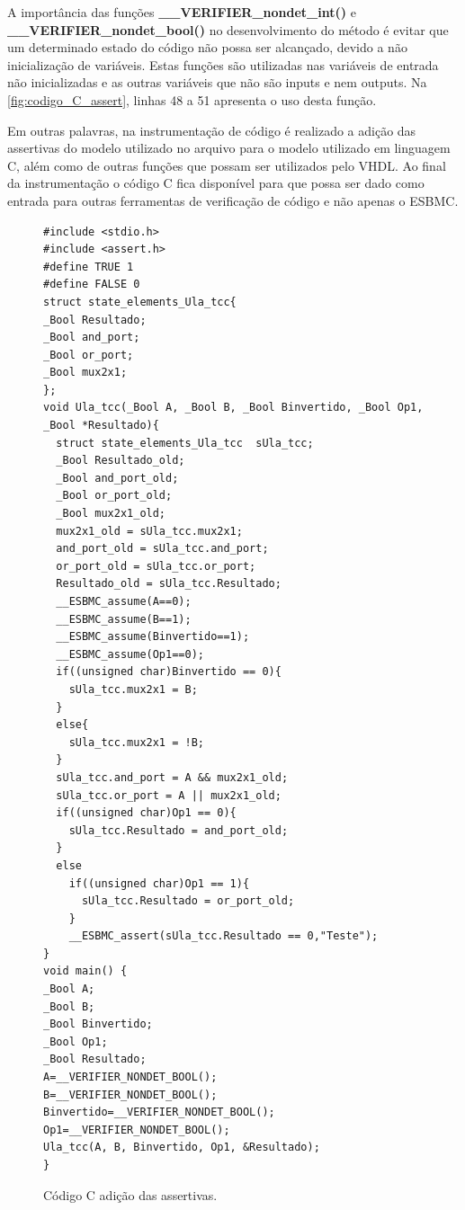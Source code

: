\par
A importância das funções \textbf{\_\_VERIFIER\_nondet\_int()} e \textbf{\_\_VERIFIER\_nondet\_bool()} no desenvolvimento do método é evitar que um determinado estado do código não possa ser alcançado, devido a não inicialização de variáveis. Estas funções são utilizadas nas variáveis de entrada não inicializadas e as outras variáveis que não são inputs e nem outputs. Na \autoref{fig:codigo_C_assert}, linhas 48 a 51 apresenta o uso desta função.

\par
Em outras palavras, na instrumentação de código é realizado a adição das assertivas do modelo utilizado no arquivo para o modelo utilizado em linguagem C, além como de outras funções que possam ser utilizados pelo VHDL. Ao final da instrumentação o código C fica disponível para que possa ser dado como entrada para outras ferramentas de verificação de código e não apenas o ESBMC. 

\begin{figure}[H]
\caption{\label{fig:codigo_C_assert} Código C adição das assertivas.}
	\begin{center}
    \begin{minipage}{0.7\textwidth}
    \begin{lstlisting}
#include <stdio.h>
#include <assert.h>
#define TRUE 1
#define FALSE 0
struct state_elements_Ula_tcc{
_Bool Resultado;
_Bool and_port;
_Bool or_port;
_Bool mux2x1;
};
void Ula_tcc(_Bool A, _Bool B, _Bool Binvertido, _Bool Op1, _Bool *Resultado){
  struct state_elements_Ula_tcc  sUla_tcc;
  _Bool Resultado_old;
  _Bool and_port_old;
  _Bool or_port_old;
  _Bool mux2x1_old;
  mux2x1_old = sUla_tcc.mux2x1;
  and_port_old = sUla_tcc.and_port;
  or_port_old = sUla_tcc.or_port;
  Resultado_old = sUla_tcc.Resultado;
  __ESBMC_assume(A==0);
  __ESBMC_assume(B==1);
  __ESBMC_assume(Binvertido==1);
  __ESBMC_assume(Op1==0);
  if((unsigned char)Binvertido == 0){
    sUla_tcc.mux2x1 = B;
  }
  else{
    sUla_tcc.mux2x1 = !B;
  }
  sUla_tcc.and_port = A && mux2x1_old;
  sUla_tcc.or_port = A || mux2x1_old;
  if((unsigned char)Op1 == 0){
    sUla_tcc.Resultado = and_port_old;
  }
  else
    if((unsigned char)Op1 == 1){
      sUla_tcc.Resultado = or_port_old;
    }
    __ESBMC_assert(sUla_tcc.Resultado == 0,"Teste");
}
void main() {
_Bool A;
_Bool B;
_Bool Binvertido;
_Bool Op1;
_Bool Resultado;
A=__VERIFIER_NONDET_BOOL();
B=__VERIFIER_NONDET_BOOL();
Binvertido=__VERIFIER_NONDET_BOOL();
Op1=__VERIFIER_NONDET_BOOL();
Ula_tcc(A, B, Binvertido, Op1, &Resultado);
}
    \end{lstlisting}
    \end{minipage}
	\end{center}
\end{figure}
